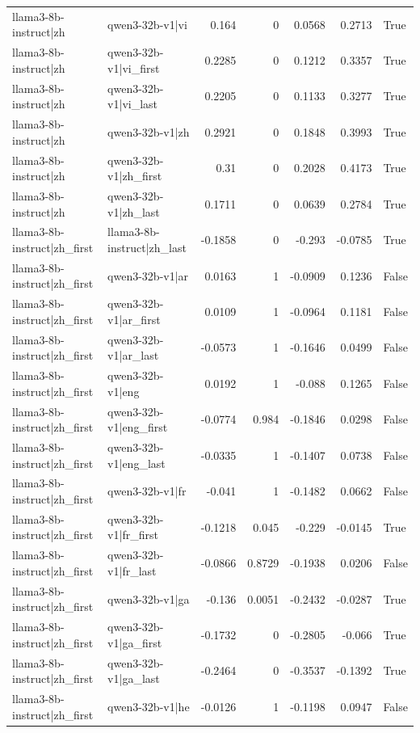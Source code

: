 \begin{table}
\begin{tabular}{l l r r r r l}
llama3-8b-instruct|zh & qwen3-32b-v1|vi & 0.164 & 0 & 0.0568 & 0.2713 & True \\
llama3-8b-instruct|zh & qwen3-32b-v1|vi_first & 0.2285 & 0 & 0.1212 & 0.3357 & True \\
llama3-8b-instruct|zh & qwen3-32b-v1|vi_last & 0.2205 & 0 & 0.1133 & 0.3277 & True \\
llama3-8b-instruct|zh & qwen3-32b-v1|zh & 0.2921 & 0 & 0.1848 & 0.3993 & True \\
llama3-8b-instruct|zh & qwen3-32b-v1|zh_first & 0.31 & 0 & 0.2028 & 0.4173 & True \\
llama3-8b-instruct|zh & qwen3-32b-v1|zh_last & 0.1711 & 0 & 0.0639 & 0.2784 & True \\
llama3-8b-instruct|zh_first & llama3-8b-instruct|zh_last & -0.1858 & 0 & -0.293 & -0.0785 & True \\
llama3-8b-instruct|zh_first & qwen3-32b-v1|ar & 0.0163 & 1 & -0.0909 & 0.1236 & False \\
llama3-8b-instruct|zh_first & qwen3-32b-v1|ar_first & 0.0109 & 1 & -0.0964 & 0.1181 & False \\
llama3-8b-instruct|zh_first & qwen3-32b-v1|ar_last & -0.0573 & 1 & -0.1646 & 0.0499 & False \\
llama3-8b-instruct|zh_first & qwen3-32b-v1|eng & 0.0192 & 1 & -0.088 & 0.1265 & False \\
llama3-8b-instruct|zh_first & qwen3-32b-v1|eng_first & -0.0774 & 0.984 & -0.1846 & 0.0298 & False \\
llama3-8b-instruct|zh_first & qwen3-32b-v1|eng_last & -0.0335 & 1 & -0.1407 & 0.0738 & False \\
llama3-8b-instruct|zh_first & qwen3-32b-v1|fr & -0.041 & 1 & -0.1482 & 0.0662 & False \\
llama3-8b-instruct|zh_first & qwen3-32b-v1|fr_first & -0.1218 & 0.045 & -0.229 & -0.0145 & True \\
llama3-8b-instruct|zh_first & qwen3-32b-v1|fr_last & -0.0866 & 0.8729 & -0.1938 & 0.0206 & False \\
llama3-8b-instruct|zh_first & qwen3-32b-v1|ga & -0.136 & 0.0051 & -0.2432 & -0.0287 & True \\
llama3-8b-instruct|zh_first & qwen3-32b-v1|ga_first & -0.1732 & 0 & -0.2805 & -0.066 & True \\
llama3-8b-instruct|zh_first & qwen3-32b-v1|ga_last & -0.2464 & 0 & -0.3537 & -0.1392 & True \\
llama3-8b-instruct|zh_first & qwen3-32b-v1|he & -0.0126 & 1 & -0.1198 & 0.0947 & False \\

\end{tabular}
\end{table}
